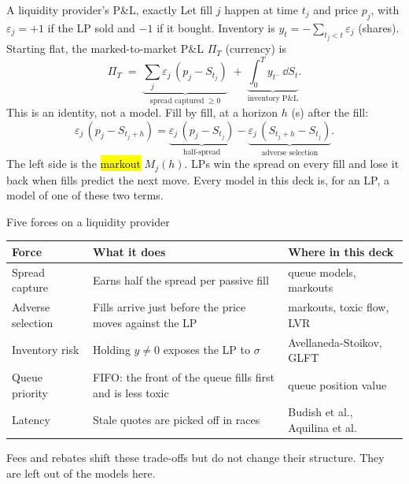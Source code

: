 \begin{frame}{A liquidity provider's P\&L, exactly}
  Let fill $j$ happen at time $t_j$ and price $p_j$, with $\varepsilon_j = +1$ if the LP sold and $-1$ if it bought. Inventory is $y_t = -\sum_{t_j < t}\varepsilon_j$ (shares). Starting flat, the marked-to-market P\&L $\Pi_T$ (currency) is
  \[
    \Pi_T \;=\; \underbrace{\sum_j \varepsilon_j\,(p_j - S_{t_j})}_{\text{spread captured}\;\ge 0}
    \;+\; \underbrace{\int_0^T y_{t^-}\,\dd S_t}_{\text{inventory P\&L}} .
  \]
  This is an identity, not a model. Fill by fill, at a horizon $h$ (s) after the fill:
  \[
    \varepsilon_j\,(p_j - S_{t_j + h}) = \underbrace{\varepsilon_j\,(p_j - S_{t_j})}_{\text{half-spread}} - \underbrace{\varepsilon_j\,(S_{t_j+h} - S_{t_j})}_{\text{adverse selection}} .
  \]
  The left side is the \hl{markout} $M_j(h)$. LPs win the spread on every fill and lose it back when fills predict the next move. Every model in this deck is, for an LP, a model of one of these two terms.
\end{frame}

\begin{frame}{Five forces on a liquidity provider}
  \small
  \begin{tabular}{p{}p{}p{}}
    \toprule
    Force & What it does & Where in this deck \\
    \midrule
    Spread capture & Earns half the spread per passive fill & queue models, markouts \\
    Adverse selection & Fills arrive just before the price moves against the LP & markouts, toxic flow, LVR \\
    Inventory risk & Holding $y \ne 0$ exposes the LP to $\sigma$ & Avellaneda-Stoikov, GLFT \\
    Queue priority & FIFO: the front of the queue fills first and is less toxic & queue position value \\
    Latency & Stale quotes are picked off in races & Budish et al., Aquilina et al. \\
    \bottomrule
  \end{tabular}
  \vspace{0.6em}

  Fees and rebates shift these trade-offs but do not change their structure. They are left out of the models here.
\end{frame}

